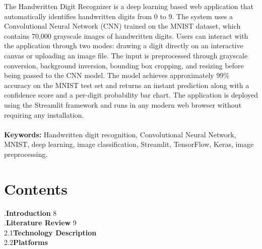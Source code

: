 \documentclass[12pt,a4paper]{report}
\begin{document}
The Handwritten Digit Recognizer is a deep learning based web application that automatically identifies handwritten digits from 0 to 9. The system uses a Convolutional Neural Network (CNN) trained on the MNIST dataset, which contains 70,000 grayscale images of handwritten digits. Users can interact with the application through two modes: drawing a digit directly on an interactive canvas or uploading an image file. The input is preprocessed through grayscale conversion, background inversion, bounding box cropping, and resizing before being passed to the CNN model. The model achieves approximately 99\% accuracy on the MNIST test set and returns an instant prediction along with a confidence score and a per-digit probability bar chart. The application is deployed using the Streamlit framework and runs in any modern web browser without requiring any installation.\\ \\
\textbf{Keywords:} Handwritten digit recognition, Convolutional Neural Network, MNIST, deep learning, image classification, Streamlit, TensorFlow, Keras, image preprocessing.

\newpage

\section*{Contents \\}

.\quad \textbf{Introduction} \hfill 8\\[20pt]

.\quad \textbf{Literature Review} \hfill 9\\[12pt]
\hspace*{1cm}2.1\quad \textbf{Technology Description} \\[12pt]
\hspace*{1cm}2.2\quad \textbf{Platforms} \\[20pt]
\end{document}
